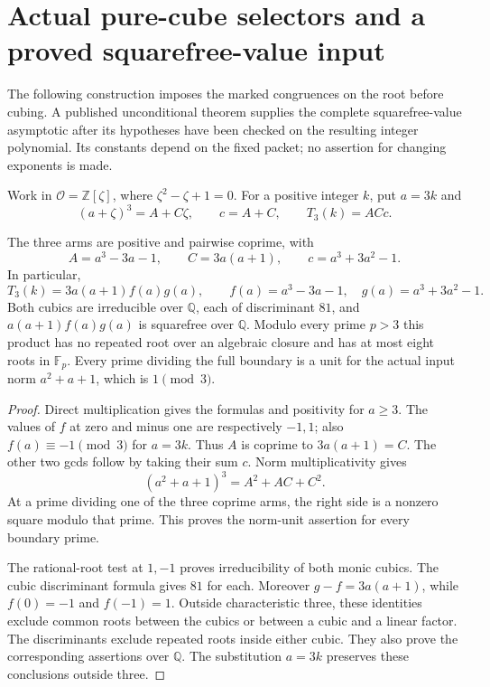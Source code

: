 \section{Actual pure-cube selectors and a proved squarefree-value input}
\label{cu19-section}

The following construction imposes the marked congruences on the root
before cubing. A published unconditional theorem supplies the complete
squarefree-value asymptotic after its hypotheses have been checked on
the resulting integer polynomial. Its constants depend on the fixed
packet; no assertion for changing exponents is made.

Work in \(\mathcal O=\mathbb Z[\zeta]\), where
\(\zeta^2-\zeta+1=0\). For a positive integer \(k\), put \(a=3k\) and
\[
 (a+\zeta)^3=A+C\zeta,\qquad c=A+C,\qquad T_3(k)=ACc.
\]

\begin{proposition}
\label{cu19-actual}
The three arms are positive and pairwise coprime, with
\[
 A=a^3-3a-1,\qquad C=3a(a+1),\qquad c=a^3+3a^2-1.
\]
In particular,
\begin{equation}
 T_3(k)=3a(a+1)f(a)g(a),\qquad
 f(a)=a^3-3a-1,\quad g(a)=a^3+3a^2-1.
 \label{cu19-boundary}
\end{equation}
Both cubics are irreducible over \(\mathbb Q\), each of discriminant
\(81\), and \(a(a+1)f(a)g(a)\) is squarefree over \(\mathbb Q\).
Modulo every prime \(p>3\) this product has no repeated root over an
algebraic closure and has at most eight roots in \(\mathbb F_p\).
Every prime dividing the full boundary is a unit for the actual input
norm \(a^2+a+1\), which is \(1\pmod3\).
\end{proposition}
\begin{proof}
Direct multiplication gives the formulas and positivity for \(a\ge3\).
The values of \(f\) at zero and minus one are respectively \(-1,1\);
also \(f(a)\equiv-1\pmod3\) for \(a=3k\).
Thus \(A\) is coprime to \(3a(a+1)=C\). The other two gcds follow
by taking their sum \(c\). Norm multiplicativity gives
\[
 (a^2+a+1)^3=A^2+AC+C^2.
\]
At a prime dividing one of the three coprime arms, the right side
is a nonzero square modulo that prime. This proves the norm-unit
assertion for every boundary prime.

The rational-root test at \(1,-1\) proves irreducibility of both
monic cubics. The cubic discriminant formula gives \(81\) for each.
Moreover \(g-f=3a(a+1)\), while \(f(0)=-1\) and \(f(-1)=1\).
Outside characteristic three, these identities exclude common
roots between the cubics or between a cubic and a linear factor.
The discriminants exclude repeated roots inside either cubic.
They also prove the corresponding assertions over \(\mathbb Q\).
The substitution \(a=3k\) preserves these conclusions outside three.
\end{proof}

